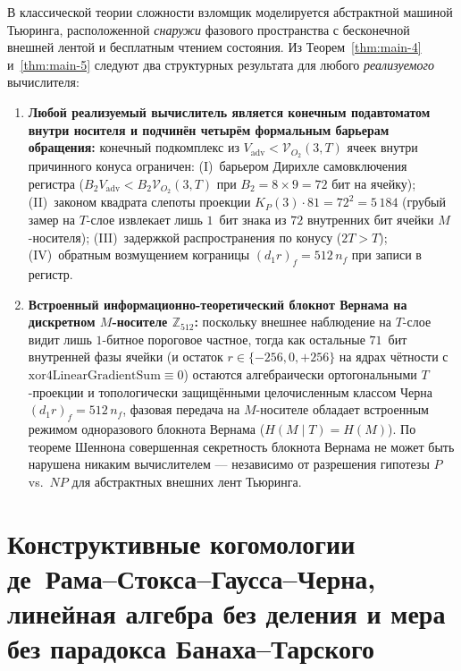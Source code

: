 \documentclass[11pt,a4paper]{article}
\theoremstyle{plain}
\theoremstyle{definition}
\begin{document}
В классической теории сложности взломщик моделируется абстрактной машиной Тьюринга, расположенной \emph{снаружи} фазового пространства с бесконечной внешней лентой и бесплатным чтением состояния. Из Теорем~\ref{thm:main-4} и~\ref{thm:main-5} следуют два структурных результата для любого \emph{реализуемого} вычислителя:
\begin{enumerate}[label=\textbf{(\arabic*)},leftmargin=*]
\item \textbf{Любой реализуемый вычислитель является конечным подавтоматом внутри носителя и подчинён четырём формальным барьерам обращения:}
  конечный подкомплекс из $V_{\mathrm{adv}} < \mathcal{V}_{O_2}(3,T)$ ячеек внутри причинного конуса ограничен:
  (I)~барьером Дирихле самовключения регистра ($B_2 V_{\mathrm{adv}} < B_2\mathcal{V}_{O_2}(3,T)$ при $B_2 = 8\times 9 = 72$ бит на ячейку);
  (II)~законом квадрата слепоты проекции $K_P(3)\cdot 81 = 72^2 = 5\,184$ (грубый замер на $T$-слое извлекает лишь $1$~бит знака из $72$ внутренних бит ячейки $M$-носителя);
  (III)~задержкой распространения по конусу ($2T > T$);
  (IV)~обратным возмущением кограницы $(d_1 r)_f = 512\,n_f$ при записи в регистр.
\item \textbf{Встроенный информационно-теоретический блокнот Вернама на дискретном $M$-носителе $\mathbb{Z}_{512}$:}
  поскольку внешнее наблюдение на $T$-слое видит лишь $1$-битное пороговое частное, тогда как остальные $71$~бит внутренней фазы ячейки (и остаток $r\in\{-256,0,+256\}$ на ядрах чётности с $\mathrm{xor4LinearGradientSum}\equiv 0$) остаются алгебраически ортогональными $T$-проекции и топологически защищёнными целочисленным классом Черна $(d_1 r)_f = 512\,n_f$, фазовая передача на $M$-носителе обладает встроенным режимом одноразового блокнота Вернама ($H(M\mid T) = H(M)$). По теореме Шеннона совершенная секретность блокнота Вернама не может быть нарушена никаким вычислителем --- независимо от разрешения гипотезы $P$ vs.\ $NP$ для абстрактных внешних лент Тьюринга.
\end{enumerate}

\section{Конструктивные когомологии де~Рама--Стокса--Гаусса--Черна, линейная алгебра без деления и мера без парадокса Банаха--Тарского}
\label{sec:constructive-foundations}
\end{document}
